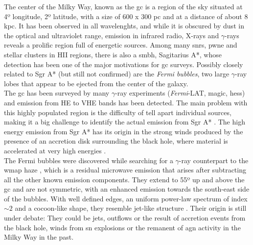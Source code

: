 \documentclass[main.tex]{subfiles}
\begin{document}
The center of the Milky Way, known as the \gls{gc} is a region of the sky situated at 4º longitude, 2º latitude, with a size of 600 x 300 pc and at a distance of about 8 kpc. It has been observed in all wavelenghts, and while it is obscured by dust in the optical and ultraviolet range, emission in infrared radio, X-rays and $\gamma$-rays reveals a prolific region full of energetic sources. Among many \glspl{snr}, \gls{pwne} and stellar clusters in HII regions, there is also a \gls{smbh}, Sagitarius A*, whose detection has been one of the major motivations for \gls{gc} surveys. 
Possibly closely related to Sgr A* (but still not confirmed) are the \textit{Fermi bubbles}, two large $\gamma$-ray lobes that appear to be ejected from the center of the galaxy.\\

The \gls{gc} has been surveyed by many $\gamma$-ray experiments (\textit{Fermi}-LAT, \gls{magic}, \gls{hess}) and emission from HE to VHE bands has been detected. The main problem with this highly populated region is the difficulty of tell apart individual sources, making it a big challenge to identify the actual emission from  Sgr A* \cite{2011GC}. The high energy emission from Sgr A* has its origin in the strong winds produced by the presence of an accretion disk surrounding the black hole, where material is accelerated at very high energies \cite{2007GC}.\\
The Fermi bubbles were discovered while searching for a $\gamma$-ray counterpart to the \gls{wmap} haze \cite{2010Afbubblesdiscovery}, which is a residual microwave emission that arises after subtracting all the other known emission components. They extend to 55º up and above the \gls{gc} and are not symmetric, with an enhanced emission towards the south-east side of the bubbles. With well defined edges, an uniform power-law spectrum of index $\sim 2$ and a cocoon-like shape, they resemble jet-like structure \cite{2014Fbubbles}. Their origin is still under debate: They could be jets, outflows or the result of accretion events from the black hole, winds from \gls{sn} explosions or the remanent of \gls{agn} activity in the Milky Way in the past. \\
\end{document}
